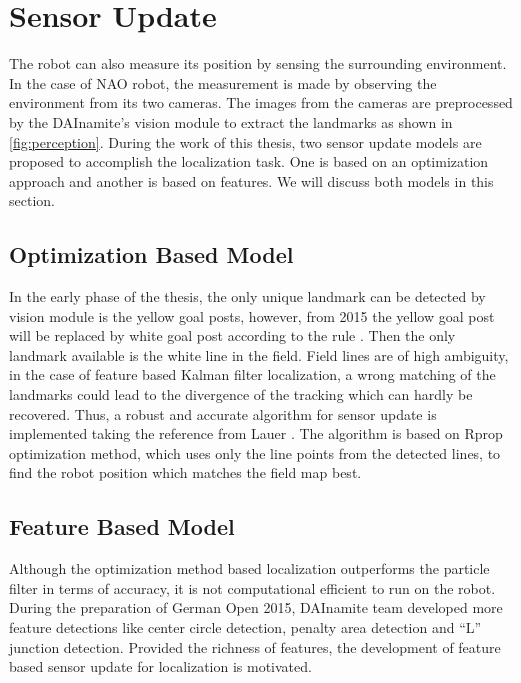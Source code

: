 \section{Sensor Update}\label{sec:sensor update}
The robot can also measure its position by sensing the surrounding environment. In the case of NAO robot, the measurement is made by observing the environment from its two cameras. The images from the cameras are preprocessed by the DAInamite's vision module to extract the landmarks as shown in \autoref{fig:perception}. During the work of this thesis, two sensor update models are proposed to accomplish the localization task. One is based on an optimization approach and another is based on features. We will discuss both models in this section.

\subsection{Optimization Based Model}\label{sec:optimization update} 
In the early phase of the thesis, the only unique landmark can be detected by vision module is the yellow goal posts, however, from 2015 the yellow goal post will be replaced by white goal post according to the rule \cite{Committee2013}. Then the only landmark available is the white line in the field. Field lines are of high ambiguity, in the case of feature based Kalman filter localization, a wrong matching of the landmarks could lead to the divergence of the tracking which can hardly be recovered. Thus, a robust and accurate algorithm for sensor update is implemented taking the reference from Lauer \cite{Lauer2006}. The algorithm is based on Rprop \cite{Riedmiller1993} optimization method, which uses only the line points from the detected lines, to find the robot position which matches the field map best. 



% 


\subsection{Feature Based Model}\label{sec:feature update} 
Although the optimization method based localization outperforms the particle filter in terms of accuracy, it is not computational efficient to run on the robot. During the preparation of German Open 2015, DAInamite team developed more feature detections like center circle detection, penalty area detection and ``L'' junction detection. Provided the richness of features, the development of feature based sensor update for localization is motivated.  

